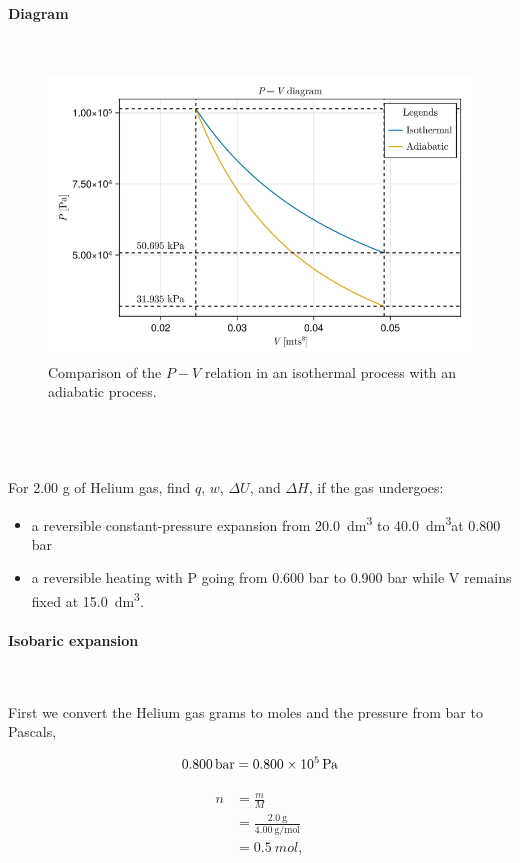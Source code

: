 \documentclass[main.tex]{subfiles}
\begin{document}
\paragraph{Diagram}~

\begin{figure}[ht!]
    \centering
    \includegraphics[width=0.9\linewidth]{imgs/hw2/pvDiagram.png}
    \caption{Comparison of the $P-V$ relation in an isothermal process with an adiabatic process.}
\end{figure}

\subsection{~}
For 2.00 g of Helium gas, find $q$, $w$, $\Delta U$, and $\Delta H$, if the gas undergoes:
\begin{itemize}
    \item a reversible constant-pressure expansion from \SI{20.0}{\deci\meter\tothe{3}} to \SI{40.0}{\deci\meter\tothe{3}}at 0.800 bar
    \item a reversible heating with P going from 0.600 bar to 0.900 bar while V remains fixed at \SI{15.0}{\deci\meter\tothe{3}}.
\end{itemize}

\paragraph{Isobaric expansion}~

First we convert the Helium gas grams to moles and the pressure from bar to Pascals,

\begin{minipage}[c]{\textwidth}
\begin{minipage}[c]{0.45\textwidth}
    \begin{gather*}
        \SI{0.800}{\bar} = \SI{0.800d5}{\pascal}
    \end{gather*}
\end{minipage}
\vrule
\begin{minipage}[c]{0.45\textwidth}
    \begin{align*}
        n &= \frac{m}{M} \\
        &= \frac{\SI{2.0}{\gram}}{\SI{4.00}{\gram\per\mol}} \\
        &= \SI{0.5}{mol},
    \end{align*}
\end{minipage}
\end{minipage}
\end{document}

